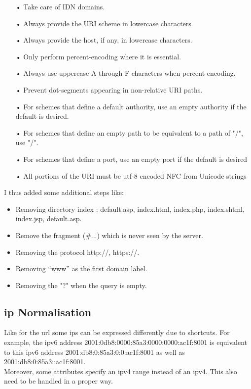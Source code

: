 \documentclass{eplmastersthesis}
\begin{document}
\begin{itemize}
\item[•] Take care of IDN domains.
\item[•] Always provide the URI scheme in lowercase characters.
\item[•] Always provide the host, if any, in lowercase characters.
\item[•] Only perform percent-encoding where it is essential.
\item[•] Always use uppercase A-through-F characters when percent-encoding.
\item[•] Prevent dot-segments appearing in non-relative URI paths.
\item[•] For schemes that define a default authority, use an empty authority if the default is desired.
\item[•] For schemes that define an empty path to be equivalent to a path of "/", use "/".
\item[•] For schemes that define a port, use an empty port if the default is desired
\item[•] All portions of the URI must be utf-8 encoded NFC from Unicode strings
\end{itemize}

I thus added some additional steps like:
\begin{itemize}
\item Removing directory index : {default.asp, index.html, index.php, index.shtml, index.jsp, default.asp}.
\item Remove the fragment (\#...) which is never seen by the server.
\item Removing the protocol {http://, https://}.
\item Removing  “www” as the first domain label.
\item Removing the "?" when the query is empty.
\end{itemize}

\subsection{\gls{ip} Normalisation}
Like for the \gls{url} some \gls{ip}s can be expressed differently due to shortcuts. For example, the \gls{ipv6} address 2001:0db8:0000:85a3:0000:0000:ac1f:8001 is equivalent to this \gls{ipv6} address 2001:db8:0:85a3:0:0:ac1f:8001 as well as 2001:db8:0:85a3::ac1f:8001.\\
Moreover, some attributes specify an \gls{ipv4} range instead of an \gls{ipv4}. This also need to be handled in a proper way.\\
\end{document}
